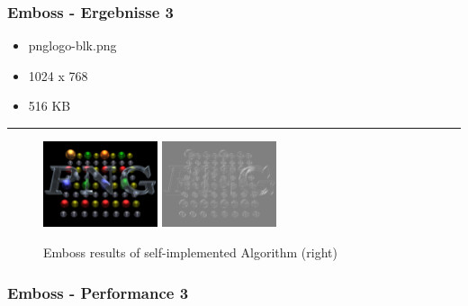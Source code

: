 \begin{frame}
    \frametitle{Emboss - Ergebnisse 3}

    \begin{itemize}
        \item pnglogo-blk.png
        \item 1024 x 768
        \item 516 KB
    \end{itemize}

    \hfill
    \hrule
    \hfill

    \begin{figure}[H]
        \centering
    
        \includegraphics[width=0.30\textwidth]{images/pnglogo-blk.png}
        \includegraphics[width=0.30\textwidth]{images/results/emboss-my.pnglogo-blk.png}

        
        \begin{center}
            \caption{Emboss results of self-implemented Algorithm (right)}
        \end{center}

        \label{fig:emboss3}
    \end{figure}
\end{frame}

\begin{frame}
    \frametitle{Emboss - Performance 3}

    

\end{frame}